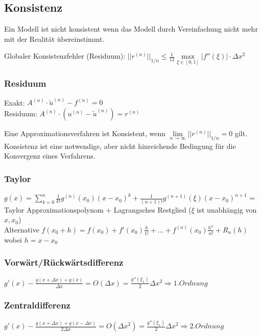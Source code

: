 \subsection{Konsistenz}
Ein Modell ist nicht konsistent wenn das Modell durch Vereinfachung nicht mehr mit der Realität übereinstimmt.

Globaler Konsistenzfehler (Residuum): $\boxed{||r^{(n)}||_{1/n}\leq \frac 1{12}\max\limits_{\xi\in[0,1]}|f''(\xi)|\cdot \Delta x^2}$

\subsubsection{Residuum}
Exakt: $A^{(n)}\cdot \tilde{u}^{(n)}-f^{(n)}=0$\\
Residuum: $A^{(n)}\cdot (u^{(n)}-\tilde{u}^{(n)})=r^{(n)}$

Eine Approximationsverfahren ist Konsistent, wenn $\boxed{\lim\limits_{n\rightarrow \infty}||r^{(n)}||_{1/n}=0}$ gilt.\\

Konsistenz ist eine notwendige, aber nicht hinreichende Bedingung für die Konvergenz eines Verfahrens.

\subsubsection{Taylor}
$g(x)= \sum\limits_{k=0}^n\frac{1}{k!} g^{(n)}(x_0)(x-x_0)^k +
\frac{1}{(n+1)!}g^{(n+1)}(\xi)(x-x_0)^{n+1}$ = Taylor
Approximationspolynom  + Lagrangsches Restglied ($\xi$ ist unabhängig von $x,x_0$)\\

Alternative
$ f(x_0+h)=f(x_0)+f'(x_0)\frac{h}{1!}+...+f^{(n)}(x_0)\frac{h^n}{n!}+R_n(h) $ wobei $ h = x - x_0 $




\subsubsection{Vorwärt/Rückwärtsdifferenz}
$g'(x) - \frac{g(x+\Delta x) + g(x)}{\Delta x}= O(\Delta x) = 
\frac{g''(\xi_1)}{2}\Delta x^2 \Rightarrow 1.Ordnung$


\subsubsection{Zentraldifferenz}
$g'(x) - \frac{g(x+\Delta x) + g(x-\Delta x)}{2\Delta x}= O(\Delta x^2) = 
\frac{g''(\xi_1)}{2}\Delta x^2 \Rightarrow 2.Ordnung$ 




